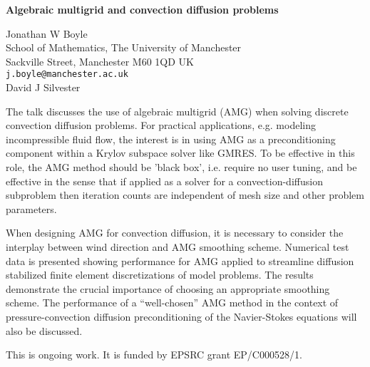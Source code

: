 \documentclass{report}
\begin{document}

\begin{center}
{\large
{\bf Algebraic multigrid and convection diffusion problems}}

	Jonathan W Boyle \\
	School of Mathematics, The University of Manchester \\
	Sackville Street, Manchester M60 1QD UK \\
	{\tt j.boyle@manchester.ac.uk} \\
	David J Silvester
\end{center}
The talk discusses the use of algebraic multigrid (AMG) when
solving discrete convection diffusion problems. For
practical applications, e.g. modeling incompressible fluid
flow, the interest is in using AMG as a preconditioning
component within a Krylov subspace solver like GMRES. To be
effective in this role, the AMG method should be 'black
box', i.e. require no user tuning, and be effective in the
sense that if applied as a solver for a convection-diffusion
subproblem then iteration counts are independent of mesh
size and other problem parameters.

When designing AMG for
convection diffusion, it is necessary to consider the
interplay between wind direction and AMG smoothing scheme.
Numerical test data is presented showing performance for AMG
applied to streamline diffusion stabilized finite element
discretizations of model problems. The results demonstrate
the crucial importance of choosing an appropriate smoothing
scheme. The performance of a ``well-chosen'' AMG method in the
context of pressure-convection diffusion preconditioning of
the Navier-Stokes equations will also be discussed.

This is ongoing work.
It is funded by EPSRC grant EP/C000528/1.


\end{document}
